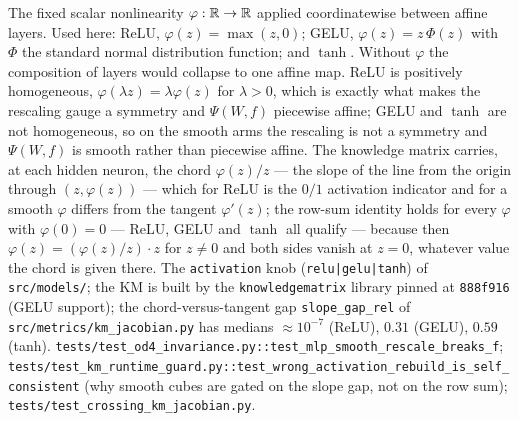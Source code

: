 {The fixed scalar nonlinearity $\varphi:\mathbb{R}\to\mathbb{R}$ applied coordinatewise between affine layers. Used here: ReLU, $\varphi(z)=\max(z,0)$; GELU, $\varphi(z)=z\,\Phi(z)$ with $\Phi$ the standard normal distribution function; and $\tanh$. Without $\varphi$ the composition of layers would collapse to one affine map.}
{ReLU is positively homogeneous, $\varphi(\lambda z)=\lambda\varphi(z)$ for $\lambda>0$, which is exactly what makes the rescaling gauge a symmetry and $\Psi(W\!,f)$ piecewise affine; GELU and $\tanh$ are not homogeneous, so on the smooth arms the rescaling is not a symmetry and $\Psi(W\!,f)$ is smooth rather than piecewise affine. The knowledge matrix carries, at each hidden neuron, the chord $\varphi(z)/z$ --- the slope of the line from the origin through $(z,\varphi(z))$ --- which for ReLU is the $0/1$ activation indicator and for a smooth $\varphi$ differs from the tangent $\varphi'(z)$; the row-sum identity holds for every $\varphi$ with $\varphi(0)=0$ --- ReLU, GELU and $\tanh$ all qualify --- because then $\varphi(z)=(\varphi(z)/z)\cdot z$ for $z\neq0$ and both sides vanish at $z=0$, whatever value the chord is given there.}
{The \texttt{activation} knob (\texttt{relu|gelu|tanh}) of \texttt{src/models/}; the KM is built by the \texttt{knowledgematrix} library pinned at \texttt{888f916} (GELU support); the chord-versus-tangent gap \texttt{slope\_gap\_rel} of \texttt{src/metrics/km\_jacobian.py} has medians $\approx10^{-7}$ (ReLU), $0.31$ (GELU), $0.59$ (tanh).}
{\texttt{tests/test\_od4\_invariance.py::test\_mlp\_smooth\_rescale\_breaks\_f}; \texttt{tests/test\_km\_runtime\_guard.py::test\_wrong\_activation\_rebuild\_is\_self\_consistent} (why smooth cubes are gated on the slope gap, not on the row sum); \texttt{tests/test\_crossing\_km\_jacobian.py}.}
